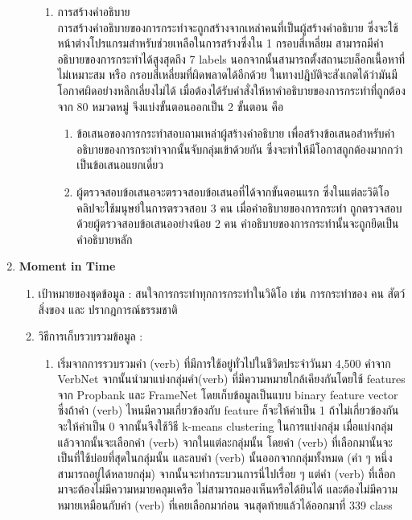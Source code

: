 \begin{enumerate}
\begin{enumerate}
\begin{enumerate}
%
		\item การสร้างคำอธิบาย
\\
		การสร้างคำอธิบายของการกระทำจะถูกสร้างจากเหล่าคนที่เป็นผู้สร้างคำอธิบาย ซึ่งจะใช้หน้าต่างโปรแกรมสำหรับช่วยเหลือในการสร้างซึ่งใน 1 กรอบสี่เหลี่ยม สามารถมีคำอธิบายของการกระทำได้สูงสุดถึง 7 labels นอกจากนั้นสามารถตั้งสถานะบล็อกเนื้อหาที่ไม่เหมาะสม หรือ กรอบสี่เหลี่ยมที่ผิดพลาดได้อีกด้วย ในทางปฎิบัติจะสังเกตได้ว่ามันมีโอกาศผิดอย่างหลีกเลี่ยงไม่ได้ เมื่อต้องได้รับคำสั่งให้หาคำอธิบายของการกระทำที่ถูกต้องจาก 80 หมวดหมู่ จึงแบ่งขั้นตอนออกเป็น 2 ขั้นตอน คือ
		\begin{enumerate}
			\item ข้อเสนอของการกระทำสอบถามเหล่าผู้สร้างคำอธิบาย เพื่อสร้างข้อเสนอสำหรับคำอธิบายของการกระทำจากนั้นจับกลุ่มเข้าด้วยกัน ซึ่งจะทำให้มีโอกาสถูกต้องมากกว่าเป็นข้อเสนอแยกเดี่ยว
			\setlength\itemsep{-0.25em}
			\item ผู้ตรวจสอบข้อเสนอจะตรวจสอบข้อเสนอที่ได้จากขั้นตอนแรก ซึ่งในแต่ละวิดิโอคลิปจะใช้มนุษย์ในการตรวจสอบ 3 คน เมื่อคำอธิบายของการกระทำ ถูกตรวจสอบด้วยผู้ตรวจสอบข้อเสนออย่างน้อย 2 คน คำอธิบายของการกระทำนั้นจะถูกยึดเป็นคำอธิบายหลัก
		\end{enumerate}
	\end{enumerate}
	\end{enumerate}
	\item \textbf{Moment in Time}
	\begin{enumerate}
		\setlength\itemsep{-0.25em}
		\item เป้าหมายของชุดข้อมูล : สนใจการกระทำทุกการกระทำในวิดิโอ เช่น การกระทำของ คน สัตว์ สิ่งของ และ ปรากฎการณ์ธรรมชาติ 
		\item วิธีการเก็บรวบรวมข้อมูล : 
	\begin{enumerate}
	\item เริ่มจากการรวบรวมคำ (verb) ที่มีการใช้อยู่ทั่วไปในชีวิตประจำวันมา 4,500 คำจาก VerbNet จากนั้นนำมาแบ่งกลุ่มคำ(verb) ที่มีความหมายใกล้เคียงกันโดยใช้ features จาก Propbank และ FrameNet โดยเก็บข้อมูลเป็นแบบ binary feature vector ซึ่งถ้าคำ (verb) ไหนมีความเกี่ยวข้องกับ feature ก็จะให้ค่าเป็น 1 ถ้าไม่เกี่ยวข้องกันจะให้ค่าเป็น 0 จากนั้นจึงใช้วิธี k-means clustering ในการแบ่งกลุ่ม เมื่อแบ่งกลุ่มแล้วจากนั้นจะเลือกคำ (verb) จากในแต่ละกลุ่มนั้น โดยคำ (verb) ที่เลือกมานั้นจะเป็นที่ใช้บ่อยที่สุดในกลุ่มนั้น และลบคำ (verb) นั้นออกจากกลุ่มทั้งหมด (คำ ๆ หนึ่งสามารถอยู่ได้หลายกลุ่ม) จากนั้นจะทำกระบวนการนี่ไปเรื่อย ๆ แต่คำ (verb) ที่เลือกมาจะต้องไม่มีความหมายคลุมเครือ ไม่สามารถมองเห็นหรือได้ยินได้ และต้องไม่มีความหมายเหมือนกับคำ (verb) ที่เคยเลือกมาก่อน จนสุดท้ายแล้วได้ออกมาที่ 339 class

\end{enumerate}
\end{enumerate}
\end{enumerate}
